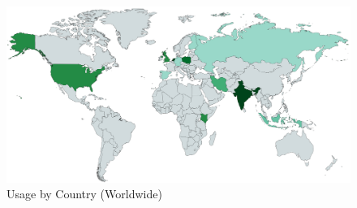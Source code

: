\documentclass{article}
\begin{document}
\begin{figure}[h]
	\includegraphics[width=\textwidth]{location-world.png}
	\caption{Usage by Country (Worldwide)}
\end{figure}
\end{document}
